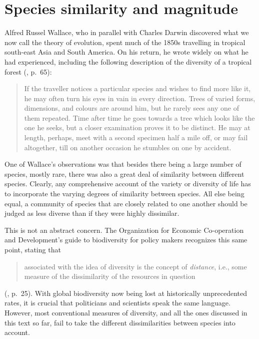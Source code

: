 \chapter{Species similarity and magnitude}


Alfred Russel Wallace, who in parallel with Charles Darwin discovered what
we now call the theory of evolution, spent much of the 1850s travelling in
tropical south-east Asia and South America.  On his return, he wrote
widely on what he had experienced, including the following description of 
the diversity of a tropical forest (\cite{Wall}, p.~65):
% 
\begin{quote}
% 
If the traveller notices a particular species and wishes to find more like it,
he may often turn his eyes in vain in every direction.  Trees of varied forms,
dimensions, and colours are around him, but he rarely sees any one of them
repeated.  Time after time he goes towards a tree which looks like the one he
seeks, but a closer examination proves it to be distinct.  He may at length,
perhaps, meet with a second specimen half a mile off, or may fail altogether,
till on another occasion he stumbles on one by accident.
\end{quote}
% 
One of Wallace's observations was that besides there being a large number
of species, mostly rare, there was also a great deal of similarity between
different species.  Clearly, any comprehensive account of the variety or
diversity of life has to incorporate the varying degrees of similarity
between species.  All else being equal, a community of species that are
closely related to one another should be judged as less diverse than if
they were highly dissimilar.

This is not an abstract concern.  The Organization for Economic
Co-operation and Development's guide to biodiversity%
%
% 
for policy%
%
%
makers recognizes this same point, stating that
% 
\begin{quote}
associated with the idea of diversity is the concept of \emph{distance},
i.e., some measure of the dissimilarity of the resources in question
\end{quote}
% 
(\cite{OECD}, p.~25).  With global biodiversity now being lost at
historically unprecedented rates, it is crucial that politicians and
scientists speak the same language.  However, most conventional measures of
diversity, and all the ones discussed in this text so far, fail to take the
different dissimilarities between species into account.

